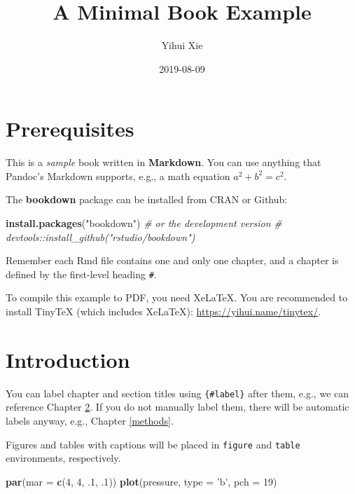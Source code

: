 \documentclass[]{book}
\title{A Minimal Book Example}
\author{Yihui Xie}
\date{2019-08-09}
\newenvironment{Shaded}{\begin{snugshade}}{\end{snugshade}}
\newcommand{\CommentTok}[1]{\textcolor[rgb]{0.56,0.35,0.01}{\textit{#1}}}
\newcommand{\DataTypeTok}[1]{\textcolor[rgb]{0.13,0.29,0.53}{#1}}
\newcommand{\DecValTok}[1]{\textcolor[rgb]{0.00,0.00,0.81}{#1}}
\newcommand{\FloatTok}[1]{\textcolor[rgb]{0.00,0.00,0.81}{#1}}
\newcommand{\KeywordTok}[1]{\textcolor[rgb]{0.13,0.29,0.53}{\textbf{#1}}}
\newcommand{\NormalTok}[1]{#1}
\newcommand{\StringTok}[1]{\textcolor[rgb]{0.31,0.60,0.02}{#1}}
\begin{document}
\maketitle

{
\setcounter{tocdepth}{1}
\tableofcontents
}
\hypertarget{prerequisites}{%
\chapter{Prerequisites}\label{prerequisites}}

This is a \emph{sample} book written in \textbf{Markdown}. You can use anything that Pandoc's Markdown supports, e.g., a math equation \(a^2 + b^2 = c^2\).

The \textbf{bookdown} package can be installed from CRAN or Github:

\begin{Shaded}
\begin{Highlighting}[]
\KeywordTok{install.packages}\NormalTok{(}\StringTok{"bookdown"}\NormalTok{)}
\CommentTok{# or the development version}
\CommentTok{# devtools::install_github("rstudio/bookdown")}
\end{Highlighting}
\end{Shaded}

Remember each Rmd file contains one and only one chapter, and a chapter is defined by the first-level heading \texttt{\#}.

To compile this example to PDF, you need XeLaTeX. You are recommended to install TinyTeX (which includes XeLaTeX): \url{https://yihui.name/tinytex/}.

\hypertarget{intro}{%
\chapter{Introduction}\label{intro}}

You can label chapter and section titles using \texttt{\{\#label\}} after them, e.g., we can reference Chapter \ref{intro}. If you do not manually label them, there will be automatic labels anyway, e.g., Chapter \ref{methods}.

Figures and tables with captions will be placed in \texttt{figure} and \texttt{table} environments, respectively.

\begin{Shaded}
\begin{Highlighting}[]
\KeywordTok{par}\NormalTok{(}\DataTypeTok{mar =} \KeywordTok{c}\NormalTok{(}\DecValTok{4}\NormalTok{, }\DecValTok{4}\NormalTok{, }\FloatTok{.1}\NormalTok{, }\FloatTok{.1}\NormalTok{))}
\KeywordTok{plot}\NormalTok{(pressure, }\DataTypeTok{type =} \StringTok{'b'}\NormalTok{, }\DataTypeTok{pch =} \DecValTok{19}\NormalTok{)}
\end{Highlighting}
\end{Shaded}
\end{document}
